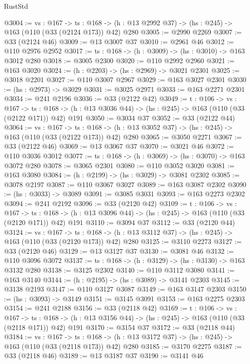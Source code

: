 \begin{lexlean}{RustStd}
\begin{coremodule}
@3004 := {vs : @167} ->
  {ts : @168} -> (h : @13 @2992 @37) -> (hs : @245) -> @163 (@110 (@33 (@2124 @173)) @42) @280
@3005 := @2990 @2269
@3007 := @33 (@2124 @46)
@3009 := @13 @3007 @37
@3010 := @2961 @46
@3012 := @110 @2976 @2952
@3017 := {ts : @168} -> (h : @3009) -> (hs : @3010) -> @163 @3012 @280
@3018 := @3005 @2300
@3020 := @110 @2992 @2960
@3021 := @163 @3020
@3024 := (h : @2203) -> (hs : @2969) -> @3021 @2301
@3025 := @3018 @2201
@3027 := @110 @3007 @2967
@3029 := @163 @3027 @2301
@3030 := (hs : @2973) -> @3029
@3031 := @3025 @2971
@3033 := @163 @2271 @2301
@3034 := @241 @2196
@3036 := @33 (@2122 @42)
@3049 := {t : @106} ->
  {vs : @167} ->
  {ts : @168} -> (h : @13 @3036 @44) -> (hs : @245) -> @163 (@110 (@33 (@2122 @171)) @42) @191
@3050 := @3034 @37
@3052 := @33 (@2122 @44)
@3064 := {vs : @167} ->
  {ts : @168} -> (h : @13 @3052 @37) -> (hs : @245) -> @163 (@110 (@33 (@2122 @173)) @42) @280
@3065 := @3050 @2271
@3067 := @33 (@2122 @46)
@3069 := @13 @3067 @37
@3070 := @3021 @46
@3072 := @110 @3036 @3012
@3077 := {ts : @168} -> (h : @3069) -> (hs : @3070) -> @163 @3072 @280
@3078 := @3065 @2301
@3080 := @110 @3052 @3020
@3081 := @163 @3080
@3084 := (h : @2199) -> (hs : @3029) -> @3081 @2302
@3085 := @3078 @2197
@3087 := @110 @3067 @3027
@3089 := @163 @3087 @2302
@3090 := (hs : @3033) -> @3089
@3091 := @3085 @3031
@3093 := @163 @2273 @2302
@3094 := @241 @2192
@3096 := @33 (@2120 @42)
@3109 := {t : @106} ->
  {vs : @167} ->
  {ts : @168} -> (h : @13 @3096 @44) -> (hs : @245) -> @163 (@110 (@33 (@2120 @171)) @42) @191
@3110 := @3094 @37
@3112 := @33 (@2120 @44)
@3124 := {vs : @167} ->
  {ts : @168} -> (h : @13 @3112 @37) -> (hs : @245) -> @163 (@110 (@33 (@2120 @173)) @42) @280
@3125 := @3110 @2273
@3127 := @33 (@2120 @46)
@3129 := @13 @3127 @37
@3130 := @3081 @46
@3132 := @110 @3096 @3072
@3137 := {ts : @168} -> (h : @3129) -> (hs : @3130) -> @163 @3132 @280
@3138 := @3125 @2302
@3140 := @110 @3112 @3080
@3141 := @163 @3140
@3144 := (h : @2195) -> (hs : @3089) -> @3141 @2303
@3145 := @3138 @2193
@3147 := @110 @3127 @3087
@3149 := @163 @3147 @2303
@3150 := (hs : @3093) -> @3149
@3151 := @3145 @3091
@3153 := @163 @2275 @2303
@3154 := @241 @2188
@3156 := @33 (@2118 @42)
@3169 := {t : @106} ->
  {vs : @167} ->
  {ts : @168} -> (h : @13 @3156 @44) -> (hs : @245) -> @163 (@110 (@33 (@2118 @171)) @42) @191
@3170 := @3154 @37
@3172 := @33 (@2118 @44)
@3184 := {vs : @167} ->
  {ts : @168} -> (h : @13 @3172 @37) -> (hs : @245) -> @163 (@110 (@33 (@2118 @173)) @42) @280
@3185 := @3170 @2275
@3187 := @33 (@2118 @46)
@3189 := @13 @3187 @37
@3190 := @3141 @46

\end{coremodule}
\end{lexlean}

